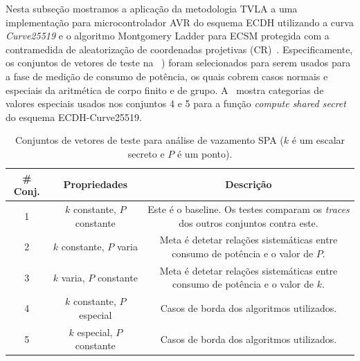 \documentclass{SBCbookchapter}
\newcommand{\tblvertpaddingfactor}{1.3}
\newcommand{\tblhorizpadding}{3pt}
\begin{document}
%
Nesta subseção mostramos a aplicação da metodologia TVLA a uma implementação para microcontrolador AVR do esquema ECDH utilizando a curva \emph{Curve25519} e o algoritmo Montgomery Ladder para ECSM protegida com a contramedida de aleatorização de coordenadas projetivas (CR)~\cite{Nascimento2015_Space}.
%
Especificamente, os conjuntos de vetores de teste na ~) foram selecionados para serem usados para a fase de medição de consumo de potência, os quais cobrem casos normais e especiais da aritmética de corpo finito e de grupo.
%
%
A~ mostra categorias de valores especiais usados nos conjuntos 4 e 5 para a função \emph{compute shared secret} do esquema ECDH-Curve25519.

\begin{table}[htb]\scriptsize
	\caption{Conjuntos de vetores de teste para análise de vazamento SPA ($k$ é um escalar secreto e $P$ é um ponto).}
	\label{tbSetsTVs}
	\centering%
	\bgroup
	\def\arraystretch{\tblvertpaddingfactor} %
	\setlength{\tabcolsep}{\tblhorizpadding} %
	\begin{tabular}{|c|c|c|} 	%
		\hline 
		\# Conj.	& Propriedades	& Descrição \\ \hline \hline
		1		& $k$ constante, $P$ constante	&	Este é o baseline. Os testes comparam os \emph{traces} dos outros conjuntos contra este. \\ \hline 
		2		& $k$ constante, $P$ varia	&	Meta é detetar relações sistemáticas entre consumo de potência e o valor de $P$. %
		\\ \hline 
		3		& $k$ varia, $P$ constante	&	Meta é detetar relações sistemáticas entre consumo de potência e o valor de $k$. \\ \hline  %
		4		& $k$ constante, $P$ especial	&	Casos de borda dos algoritmos utilizados. \\ \hline %
		5		& $k$ especial, $P$ constante	&	Casos de borda dos algoritmos utilizados. %
		\\ \hline
	\end{tabular}
	\egroup
\end{table}
\end{document}
